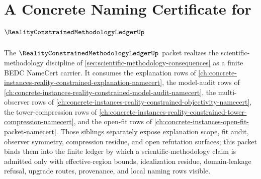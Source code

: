 \chapter{A Concrete Naming Certificate for $\RealityConstrainedMethodologyLedgerUp$}
\label{ch:concrete-instances-reality-constrained-methodology-ledger-namecert}

The $\RealityConstrainedMethodologyLedgerUp$ packet realizes the scientific-methodology discipline of \autoref{sec:scientific-methodology-consequences} as a finite BEDC NameCert carrier. It consumes the explanation rows of \autoref{ch:concrete-instances-reality-constrained-explanation-namecert}, the model-audit rows of \autoref{ch:concrete-instances-reality-constrained-model-audit-namecert}, the multi-observer rows of \autoref{ch:concrete-instances-reality-constrained-objectivity-namecert}, the tower-compression rows of \autoref{ch:concrete-instances-reality-constrained-tower-compression-namecert}, and the open-fit rows of \autoref{ch:concrete-instances-open-fit-packet-namecert}. Those siblings separately expose explanation scope, fit audit, observer symmetry, compression residue, and open refutation surfaces; this packet binds them into the finite ledger by which a scientific-methodology claim is admitted only with effective-region bounds, idealization residue, domain-leakage refusal, upgrade routes, provenance, and local naming rows visible.

